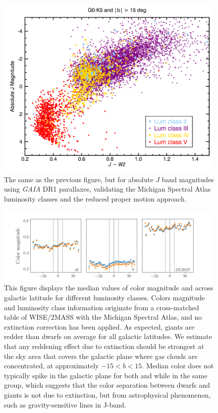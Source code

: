 \begin{figure}[t]
  \begin{center}
      \includegraphics[width=1.0\textwidth,clip=true]{Figures/absolute_j/plot-J-W2-G0-K5-b15-1.png}
 \end{center}
 \caption{The same as the previous figure, but for absolute $J$ band magnitudes using \textit{GAIA} DR1 parallaxes, validating the Michigan Spectral Atlas luminosity classes and the reduced proper motion approach.}
\end{figure}

\begin{figure}
    \centering
    \includegraphics[width=1.0\textwidth,clip=true]{Figures/populations/plot-b-vs-color.png}
    \caption{This figure displays the median values of color magnitude \jwone and \jwtwo across galactic latitude for different luminosity classes. Colors magnitude and luminosity class information originate from a cross-matched table of WISE/2MASS with the Michigan Spectral Atlas, and no extinction correction has been applied. As expected, giants are redder than dwarfs on average for all galactic latitudes. We estimate that any reddening effect due to extinction should be strongest at the sky area that covers the galactic plane where gas clouds are concentrated, at approximately $-15<b<15$. Median color does not typically spike in the galactic plane for both \jwone and \jwtwo while in the same group, which suggests that the color separation between dwarfs and giants is not due to extinction, but from astrophysical phenomenon, such as gravity-sensitive lines in J-band.}
    \label{fig:color-vs-b}
\end{figure}